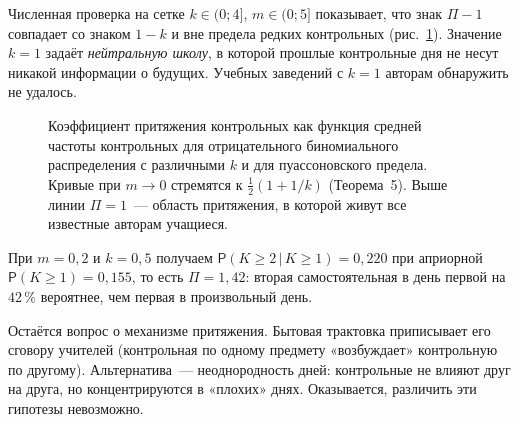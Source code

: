 \documentclass[11pt,a4paper]{article}
\begin{document}
Численная проверка на сетке $k\in(0;4]$, $m\in(0;5]$ показывает, что знак $\Pi-1$ совпадает со знаком $1-k$ и вне предела редких контрольных (рис.~\ref{fig:attract}). Значение $k=1$ задаёт \emph{нейтральную школу}, в которой прошлые контрольные дня не несут никакой информации о будущих. Учебных заведений с $k=1$ авторам обнаружить не удалось.

\begin{figure}[htbp]
\centering
{}
\caption{Коэффициент притяжения контрольных как функция средней частоты контрольных для отрицательного биномиального распределения с различными $k$ и для пуассоновского предела. Кривые при $m\to0$ стремятся к $\tfrac12(1+1/k)$ (Теорема~5). Выше линии $\Pi=1$~--- область притяжения, в которой живут все известные авторам учащиеся.}
\label{fig:attract}
\end{figure}

При $m = 0{,}2$ и $k=0{,}5$ получаем $\mathsf{P}(K\ge2\,|\,K\ge1) = 0{,}220$ при априорной $\mathsf{P}(K\ge1)=0{,}155$, то есть $\Pi = 1{,}42$: вторая самостоятельная в день первой на $42\,\%$ вероятнее, чем первая в произвольный день.

Остаётся вопрос о механизме притяжения. Бытовая трактовка приписывает его сговору учителей (контрольная по одному предмету «возбуждает» контрольную по другому). Альтернатива~--- неоднородность дней: контрольные не влияют друг на друга, но концентрируются в «плохих» днях. Оказывается, различить эти гипотезы невозможно.
\end{document}
